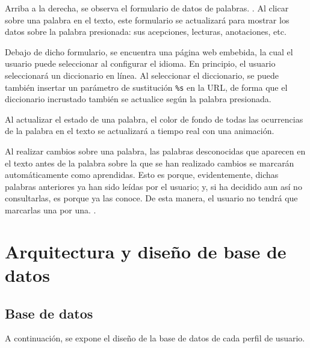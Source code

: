 Arriba a la derecha, se observa el formulario de datos de palabras. . Al clicar sobre una palabra en el texto, este formulario se actualizará para mostrar los datos sobre la palabra presionada: sus acepciones, lecturas, anotaciones, etc.

Debajo de dicho formulario, se encuentra una página web embebida, la cual el usuario puede seleccionar al configurar el idioma. En principio, el usuario seleccionará un diccionario en línea. Al seleccionar el diccionario, se puede también insertar un parámetro de sustitución \texttt{\%s} en la URL, de forma que el diccionario incrustado también se actualice según la palabra presionada.

Al actualizar el estado de una palabra, el color de fondo de todas las ocurrencias de la palabra en el texto se actualizará a tiempo real con una animación.

Al realizar cambios sobre una palabra, las palabras desconocidas que aparecen en el texto antes de la palabra sobre la que se han realizado cambios se marcarán automáticamente como aprendidas. Esto es porque, evidentemente, dichas palabras anteriores ya han sido leídas por el usuario; y, si ha decidido aun así no consultarlas, es porque ya las conoce. De esta manera, el usuario no tendrá que marcarlas una por una. .


\section{Arquitectura y diseño de base de datos}

\subsection{Base de datos}

A continuación, se expone el diseño de la base de datos de cada perfil de usuario.

